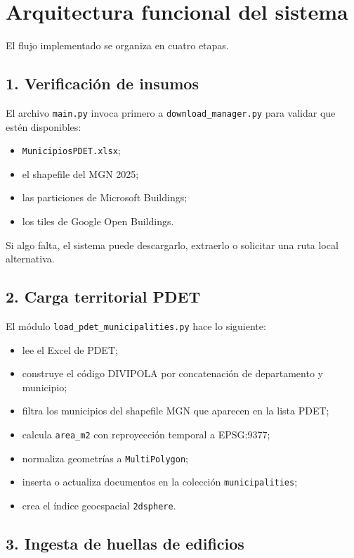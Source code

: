 \documentclass[12pt,a4paper]{article}
\begin{document}
\section{Arquitectura funcional del sistema}

El flujo implementado se organiza en cuatro etapas.

\subsection{1. Verificaci\'on de insumos}

El archivo \texttt{main.py} invoca primero a \texttt{download\_manager.py} para validar que est\'en disponibles:

\begin{itemize}
  \item \texttt{MunicipiosPDET.xlsx};
  \item el shapefile del MGN 2025;
  \item las particiones de Microsoft Buildings;
  \item los tiles de Google Open Buildings.
\end{itemize}

Si algo falta, el sistema puede descargarlo, extraerlo o solicitar una ruta local alternativa.

\subsection{2. Carga territorial PDET}

El m\'odulo \texttt{load\_pdet\_municipalities.py} hace lo siguiente:

\begin{itemize}
  \item lee el Excel de PDET;
  \item construye el c\'odigo DIVIPOLA por concatenaci\'on de departamento y municipio;
  \item filtra los municipios del shapefile MGN que aparecen en la lista PDET;
  \item calcula \texttt{area\_m2} con reproyecci\'on temporal a EPSG:9377;
  \item normaliza geometr\'ias a \texttt{MultiPolygon};
  \item inserta o actualiza documentos en la colecci\'on \texttt{municipalities};
  \item crea el \'indice geoespacial \texttt{2dsphere}.
\end{itemize}

\subsection{3. Ingesta de huellas de edificios}
\end{document}
